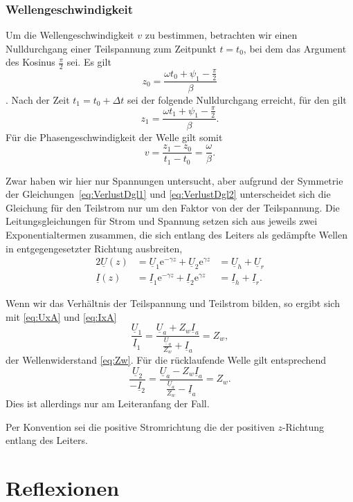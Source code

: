 \documentclass[paper=a4, parskip=half-, ngerman, fontsize=11pt]{scrreprt}
\begin{document}
\subsubsection{Wellengeschwindigkeit}

Um die Wellengeschwindigkeit $v$ zu bestimmen, betrachten wir einen Nulldurchgang einer Teilspannung zum Zeitpunkt
$t=t_{0}$, bei dem das Argument des Kosinus $\frac{\pi}{2}$ sei. Es gilt
\[ z_{0} = \frac{\omega t_{0} + \psi_{1} -\frac{\pi}{2}}{\beta} \]. Nach der Zeit $t_{1} = t_{0} + \Delta t$ sei der
folgende Nulldurchgang erreicht, für den gilt
\[ z_{1} = \frac{\omega t_{1} + \psi_{1} -\frac{\pi}{2}}{\beta}. \] Für die Phasengeschwindigkeit der Welle gilt somit
\[ v = \frac{z_{1} - z_{0}}{t_{1} - t_{0}} = \frac{\omega}{\beta}. \]

Zwar haben wir hier nur Spannungen untersucht, aber aufgrund der Symmetrie der Gleichungen~\eqref{eq:VerlustDgl1} und
\eqref{eq:VerlustDgl2} unterscheidet sich die Gleichung für den Teilstrom nur um den Faktor von der der Teilspannung.
Die Leitungsgleichungen für Strom und Spannung setzen sich aus jeweils zwei Exponentialtermen zusammen, die sich
entlang des Leiters als gedämpfte Wellen in entgegengesetzter Richtung ausbreiten,
\begin{alignat}{2}
\underline{U}(z) &= \underline{U}_{1} \mathrm{e}^{- \gamma z} + \underline{U}_{2} \mathrm{e}^{\gamma z}
&= \underline{U}_{h} + \underline{U}_{r} \\[1ex]
\underline{I}(z) &= \underline{I}_{1} \mathrm{e}^{- \gamma z} + \underline{I}_{2} \mathrm{e}^{\gamma z}
&= \underline{I}_{h} + \underline{I}_{r}.
\end{alignat}

Wenn wir das Verhältnis der Teilspannung und Teilstrom bilden, so ergibt sich mit \eqref{eq:UxA} und \eqref{eq:IxA}
\[ \frac{\underline{U}_{1}}{\underline{I}_{1}} = \frac{\underline{U}_{a} + Z_{w}
\underline{I}_{a}}{\frac{\underline{U}_{a}}{Z_{w}} + \underline{I}_{a}} = Z_{w}, \]
der Wellenwiderstand \eqref{eq:Zw}. Für die rücklaufende Welle gilt entsprechend
\[ \frac{\underline{U}_{2}}{-\underline{I}_{2}} = \frac{\underline{U}_{a} - Z_{w}
\underline{I}_{a}}{\frac{\underline{U}_{a}}{Z_{w}} - \underline{I}_{a}} = Z_{w}. \] Dies ist allerdings nur am
Leiteranfang der Fall.

Per Konvention sei die positive Stromrichtung die der positiven $z$-Richtung entlang des Leiters.


\section{Reflexionen}
\end{document}
